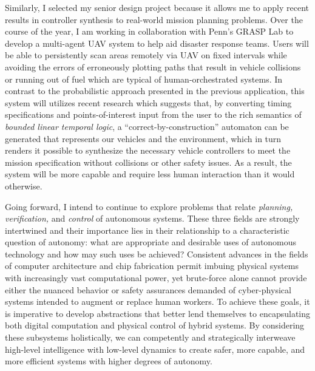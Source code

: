 \documentclass[11pt]{letter}
\begin{document}
Similarly, I selected my senior design project because it allows me to apply recent results in controller synthesis to real-world mission planning problems. Over the course of the year, I am working in collaboration with Penn's GRASP Lab to develop a multi-agent UAV system to help aid disaster response teams. Users will be able to persistently scan areas remotely via UAV on fixed intervals while avoiding the errors of erroneously plotting paths that result in vehicle collisions or running out of fuel which are typical of human-orchestrated systems. In contrast to the probabilistic approach presented in the previous application, this system will utilizes recent research which suggests that, by converting timing specifications and points-of-interest input from the user to the rich semantics of \emph{bounded linear temporal logic}, a ``correct-by-construction'' automaton can be generated that represents our vehicles and the environment, which in turn renders it possible to synthesize the necessary vehicle controllers to meet the mission specification without collisions or other safety issues.  As a result, the system will be more capable and require less human interaction than it would otherwise.

Going forward, I intend to continue to explore problems that relate \emph{planning, verification,} and \emph{control} of autonomous systems.  These three fields are strongly intertwined and their importance lies in their relationship to a characteristic question of autonomy:  what are appropriate and desirable uses of autonomous technology and how may such uses be achieved? Consistent advances in the fields of computer architecture and chip fabrication permit imbuing physical systems with increasingly vast computational power, yet brute-force alone cannot provide either the nuanced behavior or safety assurances demanded of cyber-physical systems intended to augment or replace human workers. To achieve these goals, it is imperative to develop abstractions that better lend themselves to encapsulating both digital computation and physical control of hybrid systems. By considering these subsystems holistically, we can competently and strategically interweave high-level intelligence with low-level dynamics to create safer, more capable, and more efficient systems with higher degrees of autonomy.  
\end{document}
